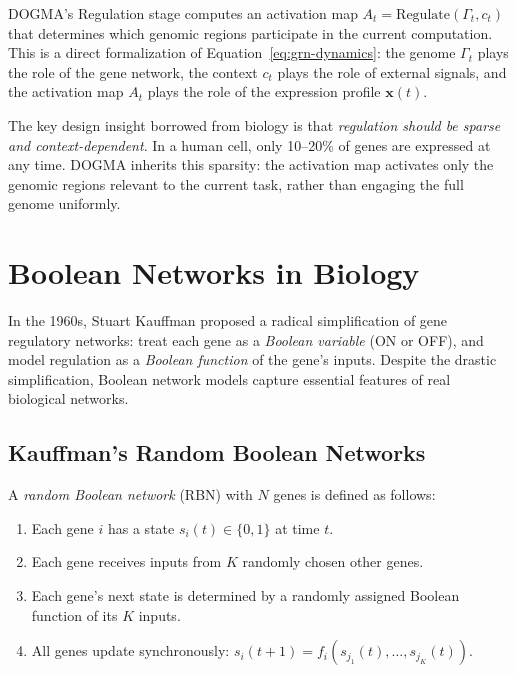 \begin{keyinsight}
DOGMA's Regulation stage computes an activation map $A_t = \mathrm{Regulate}(\Gamma_t, c_t)$ that determines which genomic regions participate in the current computation. This is a direct formalization of Equation~\ref{eq:grn-dynamics}: the genome $\Gamma_t$ plays the role of the gene network, the context $c_t$ plays the role of external signals, and the activation map $A_t$ plays the role of the expression profile $\mathbf{x}(t)$.

The key design insight borrowed from biology is that \emph{regulation should be sparse and context-dependent}. In a human cell, only 10--20\% of genes are expressed at any time. DOGMA inherits this sparsity: the activation map activates only the genomic regions relevant to the current task, rather than engaging the full genome uniformly.
\end{keyinsight}

\section{Boolean Networks in Biology}
\label{sec:boolean-networks}

In the 1960s, Stuart Kauffman proposed a radical simplification of gene regulatory networks: treat each gene as a \emph{Boolean variable} (ON or OFF), and model regulation as a \emph{Boolean function} of the gene's inputs. Despite the drastic simplification, Boolean network models capture essential features of real biological networks.

\subsection{Kauffman's Random Boolean Networks}

A \emph{random Boolean network} (RBN) with $N$ genes is defined as follows:

\begin{enumerate}[leftmargin=1.8em]
  \item Each gene $i$ has a state $s_i(t) \in \{0, 1\}$ at time $t$.
  \item Each gene receives inputs from $K$ randomly chosen other genes.
  \item Each gene's next state is determined by a randomly assigned Boolean function of its $K$ inputs.
  \item All genes update synchronously: $s_i(t+1) = f_i(s_{j_1}(t), \ldots, s_{j_K}(t))$.
\end{enumerate}


